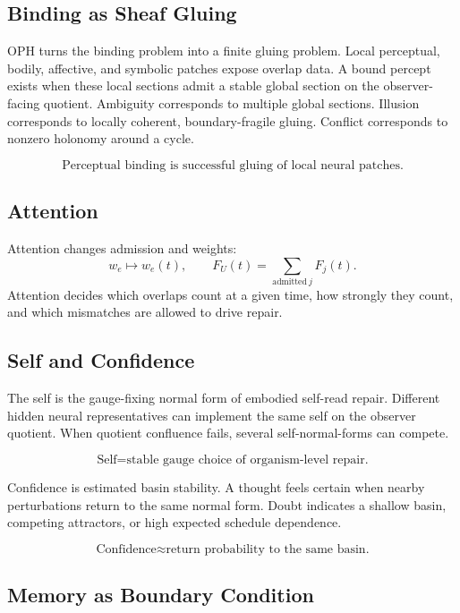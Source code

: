 \documentclass[11pt]{article}
\theoremstyle{remark}
\theoremstyle{plain}
\begin{document}
\subsection{Binding as Sheaf Gluing}

OPH turns the binding problem into a finite gluing problem. Local perceptual, bodily, affective, and symbolic patches expose overlap data. A bound percept exists when these local sections admit a stable global section on the observer-facing quotient. Ambiguity corresponds to multiple global sections. Illusion corresponds to locally coherent, boundary-fragile gluing. Conflict corresponds to nonzero holonomy around a cycle.

\[
\boxed{
\text{Perceptual binding is successful gluing of local neural patches.}
}
\]

\subsection{Attention}

Attention changes admission and weights:
\[
w_e\mapsto w_e(t),
\qquad
F_U(t)=\sum_{\mathrm{admitted}\ j}F_j(t).
\]
Attention decides which overlaps count at a given time, how strongly they count, and which mismatches are allowed to drive repair.

\subsection{Self and Confidence}

The self is the gauge-fixing normal form of embodied self-read repair. Different hidden neural representatives can implement the same self on the observer quotient. When quotient confluence fails, several self-normal-forms can compete.

\[
\boxed{
\text{Self}=\text{stable gauge choice of organism-level repair.}
}
\]

Confidence is estimated basin stability. A thought feels certain when nearby perturbations return to the same normal form. Doubt indicates a shallow basin, competing attractors, or high expected schedule dependence.

\[
\boxed{
\text{Confidence}\approx\text{return probability to the same basin.}
}
\]

\subsection{Memory as Boundary Condition}
\end{document}
